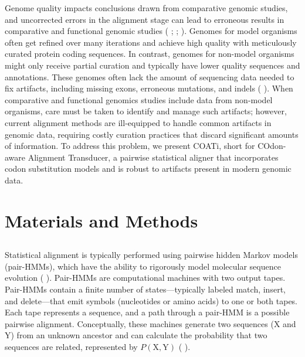 \documentclass[12pt,letterpaper]{article}
\renewcommand{\cite}[1]{\citeauthor{#1} \citeyear{#1}}
\newcommand{\citetwo}[2]{\cite{#1}; \cite{#2}}
\newcommand{\citembe}[1]{(\cite{#1})}
\newcommand{\citembethree}[3]{(\citetwo{#1}{#2}; \cite{#3})}
\providecommand{\DIFaddtex}[1]{{\protect\color{blue}\uwave{#1}}} %
\providecommand{\DIFaddbegin}{} %
\providecommand{\DIFaddend}{} %
\providecommand{\DIFadd}[1]{\texorpdfstring{\DIFaddtex{#1}}{#1}} %
\newcommand{\DIFaddincludegraphics}[2][]{{\color{blue}\fbox{\DIFOincludegraphics[#1]{#2}}}} %
\DeclareRobustCommand{\DIFaddbegin}{\DIFOaddbegin \let\includegraphics\DIFaddincludegraphics} %
\DeclareRobustCommand{\DIFaddend}{\DIFOaddend \let\includegraphics\DIFOincludegraphics} %
\begin{document}
Genome quality impacts conclusions drawn from comparative genomic studies, and uncorrected errors in the alignment stage can lead to erroneous results in comparative and functional genomic studies \citembethree{estimates_schneider_2009}{effect_fletcher_2010}{hubisz2011error}.
Genomes for model organisms often get refined over many iterations and achieve high quality with meticulously curated protein coding sequences.
In contrast, genomes for non-model organisms might only receive partial curation and typically have lower quality sequences and annotations.
These genomes often lack the amount of sequencing data needed to fix artifacts, including missing exons, erroneous mutations, and indels \citembe{jackman2018tigmint}.
%
When comparative and functional genomics studies include data from non-model organisms, care must be taken to identify and manage such artifacts; however,
current alignment methods are ill-equipped to handle common artifacts in genomic data, requiring costly curation practices that discard significant amounts of information.
To address this problem, we present COATi, short for COdon-aware Alignment Transducer, a pairwise statistical aligner that incorporates codon substitution models and is robust to artifacts present in modern genomic data.



\section*{Materials and Methods}

\DIFaddbegin \subsection*{\DIFadd{Statistical Alignment}}

\DIFaddend Statistical alignment is typically performed using pairwise hidden Markov models (pair-HMMs), which have the ability to rigorously model molecular sequence evolution \citembe{bradley2007transducers}.
Pair-HMMs are computational machines with two output tapes. Pair-HMMs contain a finite number of states---typically labeled match, insert, and delete---that emit symbols (nucleotides or amino acids) to one or both tapes.
Each tape represents a sequence, and a path through a pair-HMM is a possible pairwise alignment.
Conceptually, these machines generate two sequences ($\text{X}$ and $\text{Y}$) from an unknown ancestor and can calculate the probability that two sequences are related, represented by $P(\text{X}, \text{Y})$ \citembe{yoon_2009_hmm}.
\end{document}
